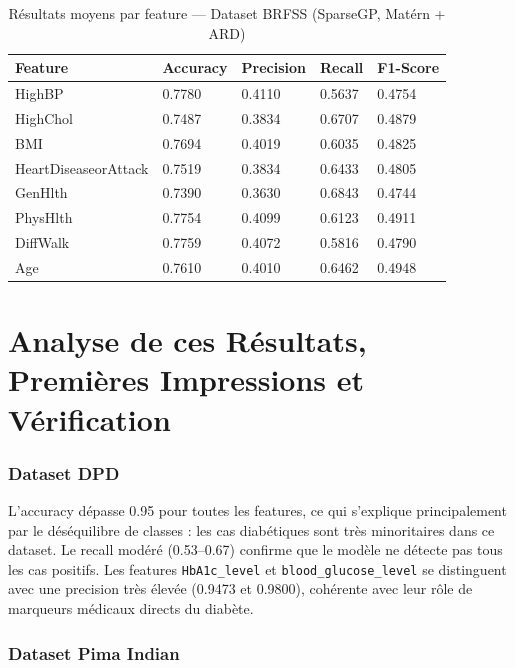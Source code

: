 \documentclass[12pt,a4paper]{article}
\begin{document}
\begin{table}[H]
\centering
\caption{Résultats moyens par feature — Dataset BRFSS (SparseGP, Matérn + ARD)}
\label{tab:brfss_results}
\small
\begin{tabular}{p{3.5cm}p{2.5cm}p{2.5cm}p{2.5cm}p{2.5cm}}
\hline
\textbf{Feature} & \textbf{Accuracy} & \textbf{Precision} & \textbf{Recall} & \textbf{F1-Score} \\
\hline
HighBP                & 0.7780 & 0.4110 & 0.5637 & 0.4754 \\
HighChol              & 0.7487 & 0.3834 & 0.6707 & 0.4879 \\
BMI                   & 0.7694 & 0.4019 & 0.6035 & 0.4825 \\
HeartDiseaseorAttack  & 0.7519 & 0.3834 & 0.6433 & 0.4805 \\
GenHlth               & 0.7390 & 0.3630 & 0.6843 & 0.4744 \\
PhysHlth              & 0.7754 & 0.4099 & 0.6123 & 0.4911 \\
DiffWalk              & 0.7759 & 0.4072 & 0.5816 & 0.4790 \\
Age                   & 0.7610 & 0.4010 & 0.6462 & 0.4948 \\
\hline
\end{tabular}
\end{table}


\section{Analyse de ces Résultats, Premières Impressions et Vérification}

\subsubsection*{Dataset DPD}

L'accuracy dépasse 0.95 pour toutes les features, ce qui s'explique principalement par le déséquilibre de classes : les cas diabétiques sont très minoritaires dans ce dataset. Le recall modéré (0.53–0.67) confirme que le modèle ne détecte pas tous les cas positifs. Les features \texttt{HbA1c\_level} et \texttt{blood\_glucose\_level} se distinguent avec une precision très élevée (0.9473 et 0.9800), cohérente avec leur rôle de marqueurs médicaux directs du diabète.

\subsubsection*{Dataset Pima Indian}
\end{document}
